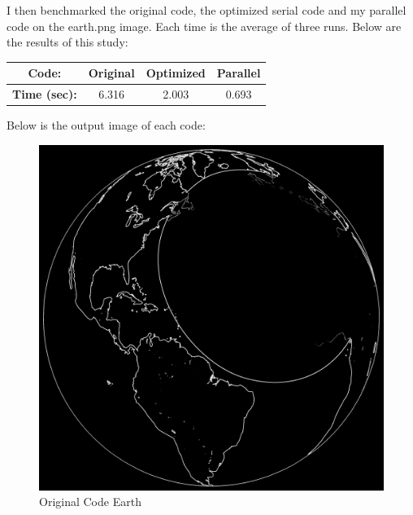 \documentclass[letterpaper,11pt]{article}
\begin{document}
I then benchmarked the original code, the optimized serial code and my parallel code on the earth.png image. Each time is the average of three runs.  Below are the results of this study:
\begin{center}
 \begin{tabular}{|c| c c c|}
 \hline
 \textbf{Code:} & Original & Optimized & Parallel \\[1.5ex]
 \hline
 \textbf{Time (sec):} & 6.316 & 2.003 & 0.693 \\
 \hline
\end{tabular}
\end{center}
Below is the output image of each code:
\begin{figure}[H]
  \caption{Original Code Earth}
  \includegraphics[scale=0.1]{earth_orig.png}
\end{figure}
\end{document}
